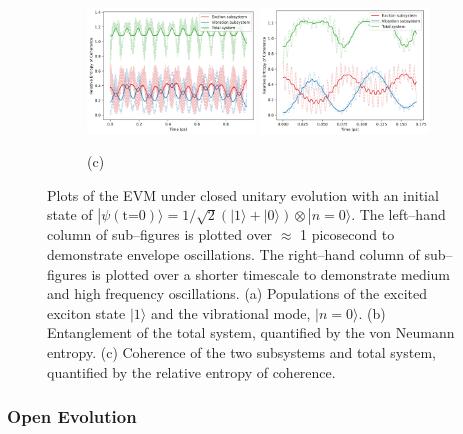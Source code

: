 \documentclass[11pt]{article}
\begin{document}
\begin{figure}[H]
    \vspace{0.8em}

    \begin{subfigure}{\textwidth}
        \centering
        \includegraphics[width=0.49\textwidth]{Research Project/Code/results/ExVib/Closed/Envelope/coh_eg.png}
        \hfill
        \includegraphics[width=0.49\textwidth]{Research Project/Code/results/ExVib/Closed/Fast/coh_eg.png}
        \caption{(c)}
        \label{fig:EVM_CQS_coh_e0}
    \end{subfigure}

    \caption{Plots of the EVM under closed unitary evolution with an initial state of $|\psi (\text{t=0})\rangle = 1/\sqrt{2}(|1\rangle + |0\rangle)\otimes|n=0\rangle$. The left--hand column of sub--figures is plotted over $\approx$ 1 picosecond to demonstrate envelope oscillations. The right--hand column of sub--figures is plotted over a shorter timescale to demonstrate medium and high frequency oscillations. (a) Populations of the excited exciton state $|1\rangle$ and the vibrational mode, $|n=0\rangle$. (b) Entanglement of the total system, quantified by the von Neumann entropy. (c) Coherence of the two subsystems and total system, quantified by the relative entropy of coherence.} 
    \label{fig:EVM_CQS_eg}
\end{figure}

\newpage
\subsubsection{Open Evolution}
\end{document}
